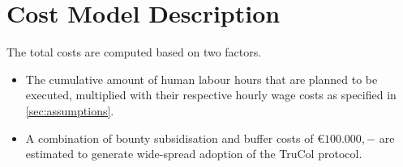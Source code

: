 \section{Cost Model Description}\label{sec:model_description}
The total costs are computed based on two factors.
\begin{itemize}
	\item The cumulative amount of human labour hours that are planned to be executed, multiplied with their respective hourly wage costs as specified in \cref{sec:assumptions}. 
	\item A combination of bounty subsidisation and buffer costs of \euro$100.000,-$ are estimated to generate wide-spread adoption of the TruCol protocol.
\end{itemize}